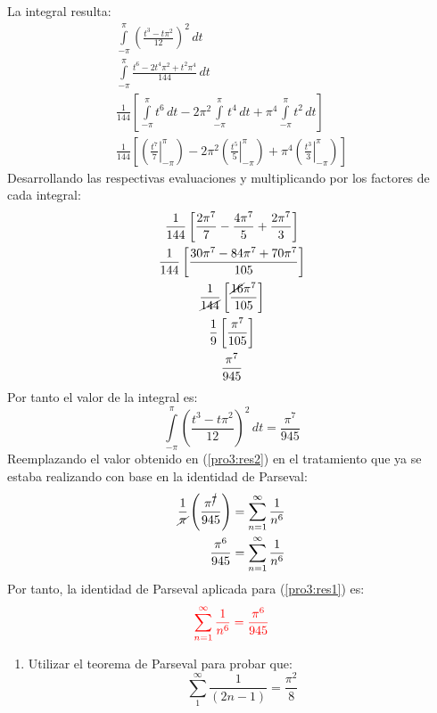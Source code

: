 \begin{multicols}{2}
La integral resulta:
\begin{gather*}
    \int\limits_{-\pi}^{\pi} \left(\frac{t^{3} - t\pi^{2}}{12}\right)^{2} \,dt\\
    \int\limits_{-\pi}^{\pi} \frac{t^{6} - 2t^{4}\pi^{2} + t^{2}\pi^{4}}{144} \,dt\\
    \frac{1}{144} \left[\int\limits_{-\pi}^{\pi} t^{6} \,dt - 2\pi^{2}\int\limits_{-\pi}^{\pi} t^{4} \,dt + \pi^{4}\int\limits_{-\pi}^{\pi} t^{2} \,dt\right]\\
    \frac{1}{144} \left[\left(\left.\frac{t^{7}}{7}\right|_{-\pi}^{\pi}\right) - 2\pi^{2}\left(\left.\frac{t^{5}}{5}\right|_{-\pi}^{\pi}\right) + \pi^{4}\left(\left.\frac{t^{3}}{3}\right|_{-\pi}^{\pi}\right)\right]
\end{gather*}
Desarrollando las respectivas evaluaciones y multiplicando por los factores de cada integral:
\begin{gather*}
    \frac{1}{144} \left[\frac{2\pi^{7}}{7} - \frac{4\pi^{7}}{5} + \frac{2\pi^{7}}{3}\right]\\
    \frac{1}{144} \left[\frac{30\pi^{7} - 84\pi^{7} + 70\pi^{7}}{105}\right]\\
    \frac{1}{\cancel{144}} \left[\frac{\cancel{16}\pi^{7}}{105}\right]\\
    \frac{1}{9} \left[\frac{\pi^{7}}{105}\right]\\
    \frac{\pi^{7}}{945}
\end{gather*}
Por tanto el valor de la integral es:
\begin{equation}
    \int\limits_{-\pi}^{\pi} \left(\frac{t^{3} - t\pi^{2}}{12}\right)^{2} \,dt = \frac{\pi^{7}}{945} \label{pro3:res2}
\end{equation}
Reemplazando el valor obtenido en (\ref{pro3:res2}) en el tratamiento que ya se estaba realizando con base en la identidad de Parseval:
\begin{align*}
    \frac{1}{\cancel{\pi}} \left(\frac{\pi^{\cancel{7}}}{945}\right) &= \sum_{n=1}^{\infty} \frac{1}{n^{6}}\\
    \frac{\pi^{6}}{945} &= \sum_{n=1}^{\infty} \frac{1}{n^{6}}
\end{align*}
Por tanto, la identidad de Parseval aplicada para (\ref{pro3:res1}) es:
\begin{equation}
    \textcolor{rojo}{\sum_{n=1}^{\infty} \frac{1}{n^{6}} = \frac{\pi^{6}}{945}} \label{pro3:res3}
\end{equation}

\begin{enumerate}[leftmargin=15pt, resume]
    \item Utilizar el teorema de Parseval para probar que:
    \begin{equation*}
        \sum_{1}^{\infty} \frac{1}{(2n-1)} = \frac{\pi^{2}}{8}
    \end{equation*}
\end{enumerate}


\end{multicols}
